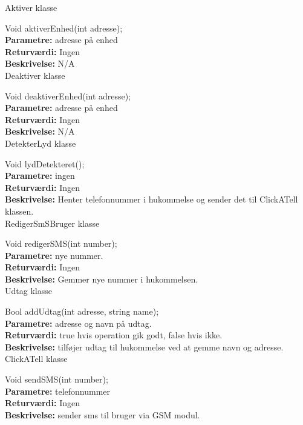 {\centering Aktiver klasse}

Void aktiverEnhed(int adresse); \\
\textbf{Parametre:} adresse på enhed \\
\textbf{Returværdi:} Ingen \\
\textbf{Beskrivelse:} N/A \\

{\centering Deaktiver klasse}

Void deaktiverEnhed(int adresse); \\
\textbf{Parametre:} adresse på enhed \\
\textbf{Returværdi:} Ingen \\
\textbf{Beskrivelse:} N/A \\

{\centering DetekterLyd klasse}

Void lydDetekteret(); \\
\textbf{Parametre:} ingen \\
\textbf{Returværdi:} Ingen \\
\textbf{Beskrivelse:} Henter telefonnummer i hukommelse og sender det til ClickATell klassen. \\

{\centering RedigerSmSBruger klasse}

Void redigerSMS(int number); \\
\textbf{Parametre:} nye nummer. \\
\textbf{Returværdi:} Ingen \\
\textbf{Beskrivelse:} Gemmer nye nummer i hukommelsen. \\

{\centering Udtag klasse}

Bool addUdtag(int adresse, string name); \\
\textbf{Parametre:} adresse og navn på udtag. \\
\textbf{Returværdi:} true hvis operation gik godt, false hvis ikke. \\
\textbf{Beskrivelse:} tilføjer udtag til hukommelse ved at gemme navn og adresse. \\

{\centering ClickATell klasse}

Void sendSMS(int number); \\
\textbf{Parametre:} telefonnummer \\
\textbf{Returværdi:} Ingen \\
\textbf{Beskrivelse:} sender sms til bruger via GSM modul. \\

